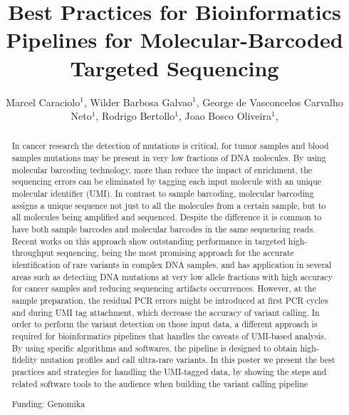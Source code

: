 \documentclass[twoside]{article}
\title{\vspace{-15mm}\fontsize{24pt}{10pt}\selectfont\textbf{ Best Practices for Bioinformatics Pipelines for Molecular-Barcoded Targeted Sequencing }} %
\author{ Marcel Caraciolo$^{1}$, Wilder Barbosa Galvao$^{1}$, George de Vasconcelos Carvalho Neto$^{1}$, Rodrigo Bertollo$^{1}$, Joao Bosco Oliveira$^{1}$, }
\affil{ 1 Genomika

 }
\date{}
\begin{document}
  
  
  \maketitle %
  
  
  \thispagestyle{fancy} %
  
  
  \begin{abstract}
  In cancer research the detection of mutations is critical, for tumor samples and blood samples mutations may be present in very low fractions of DNA molecules. By using molecular barcoding technology, more than reduce the impact of enrichment, the sequencing errors can be eliminated by tagging each input molecule with an unique molecular identifier (UMI). In contrast to sample barcoding, molecular barcoding assigns a unique sequence not just to all the molecules from a certain sample, but to all molecules being amplified and sequenced. Despite the difference it is common to have both sample barcodes and molecular barcodes in the same sequencing reads. Recent works on this approach show outstanding performance in targeted high-throughput sequencing, being the most promising approach for the accurate identification of rare variants in complex DNA samples, and has application in several areas such as detecting DNA mutations at very low allele fractions with high accuracy for cancer samples and reducing sequencing artifacts occurrences. However,  at the sample preparation, the residual PCR errors might be introduced at first PCR cycles and during UMI tag attachment, which decrease the accuracy of variant calling.  In order to perform the variant detection on those input data, a different approach is required for bioinformatics pipelines that handles the caveats of UMI-based analysis. By using specific algorithms and softwares, the pipeline is designed to obtain high-fidelity mutation profiles and call ultra-rare variants.  In this poster we present the best practices and strategies for handling the UMI-tagged data, by showing the steps and related software tools to the audience when building the variant calling pipeline
  
  Funding: Genomika \\ 
  \end{abstract}
  
\end{document}
